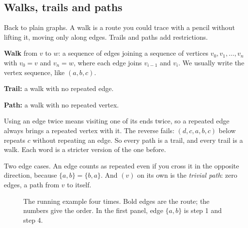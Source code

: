 \subsection{Walks, trails and paths}

Back to plain graphs. A walk is a route you could trace with a pencil without lifting it, moving only along edges. Trails and paths add restrictions.

\begin{notebox}
\textbf{Walk} from $v$ to $w$: a sequence of edges joining a sequence of vertices $v_0,v_1,\dots,v_n$ with $v_0=v$ and $v_n=w$, where each edge joins $v_{i-1}$ and $v_i$. We usually write the vertex sequence, like $(a,b,c)$.

\textbf{Trail:} a walk with no repeated edge.

\textbf{Path:} a walk with no repeated vertex.
\end{notebox}

Using an edge twice means visiting one of its ends twice, so a repeated edge always brings a repeated vertex with it. The reverse fails: $(d,c,a,b,c)$ below repeats $c$ without repeating an edge. So every path is a trail, and every trail is a walk. Each word is a stricter version of the one before.

Two edge cases. An edge counts as repeated even if you cross it in the opposite direction, because $\{a,b\}=\{b,a\}$. And $(v)$ on its own is the \emph{trivial path}: zero edges, a path from $v$ to itself.

\begin{figure}[H]
\centering
{}
\caption{The running example four times. Bold edges are the route; the numbers give the order. In the first panel, edge $\{a,b\}$ is step 1 and step 4.}
\end{figure}

